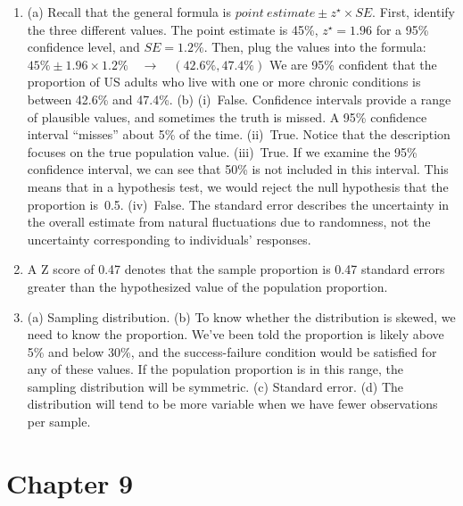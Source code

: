\documentclass[
  10pt,
  openany]{book}
\providecommand{\tightlist}{%
  \setlength{\itemsep}{0pt}\setlength{\parskip}{0pt}}
\begin{document}
\begin{enumerate}
\def\labelenumi{\arabic{enumi}.}
\tightlist
\item
  (a) Recall that the general formula is \(point~estimate \pm z^{\star} \times SE\). First, identify the three different values. The point estimate is 45\%, \(z^{\star} = 1.96\) for a 95\% confidence level, and \(SE = 1.2\%\). Then, plug the values into the formula: \(45\% \pm 1.96 \times 1.2\% \quad\to\quad (42.6\%, 47.4\%)\) We are 95\% confident that the proportion of US adults who live with one or more chronic conditions is between 42.6\% and 47.4\%. (b) (i)~False. Confidence intervals provide a range of plausible values, and sometimes the truth is missed. A 95\% confidence interval ``misses'' about 5\% of the time. (ii)~True. Notice that the description focuses on the true population value. (iii)~True. If we examine the 95\% confidence interval, we can see that 50\% is not included in this interval. This means that in a hypothesis test, we would reject the null hypothesis that the proportion is~0.5. (iv)~False. The standard error describes the uncertainty in the overall estimate from natural fluctuations due to randomness, not the uncertainty corresponding to individuals' responses.

  \addtocounter{enumi}{1}
\item
  A Z score of 0.47 denotes that the sample proportion is 0.47 standard errors greater than the hypothesized value of the population proportion.

  \addtocounter{enumi}{1}
\item
  (a) Sampling distribution. (b) To know whether the distribution is skewed, we need to know the proportion. We've been told the proportion is likely above 5\% and below 30\%, and the success-failure condition would be satisfied for any of these values. If the population proportion is in this range, the sampling distribution will be symmetric. (c) Standard error. (d) The distribution will tend to be more variable when we have fewer observations per sample.

  \addtocounter{enumi}{1}
\end{enumerate}

\hypertarget{exercise-solutions-14}{%
\section{Chapter 9}\label{exercise-solutions-14}}
\end{document}
